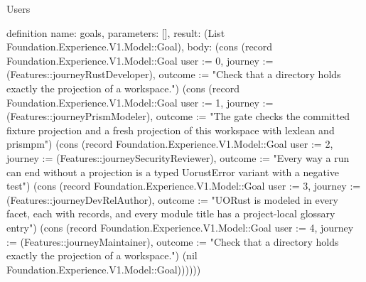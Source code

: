 \begin{lexlean}{Users}
\begin{semanticmodule}
definition{
  name: goals,
  parameters: [],
  result: (List Foundation.Experience.V1.Model::Goal),
  body: (cons (record Foundation.Experience.V1.Model::Goal {user := 0, journey := (Features::journeyRustDeveloper), outcome := "Check that a directory holds exactly the projection of a workspace."}) (cons (record Foundation.Experience.V1.Model::Goal {user := 1, journey := (Features::journeyPrismModeler), outcome := "The gate checks the committed fixture projection and a fresh projection of this workspace with lexlean and prismpm"}) (cons (record Foundation.Experience.V1.Model::Goal {user := 2, journey := (Features::journeySecurityReviewer), outcome := "Every way a run can end without a projection is a typed UorustError variant with a negative test"}) (cons (record Foundation.Experience.V1.Model::Goal {user := 3, journey := (Features::journeyDevRelAuthor), outcome := "UORust is modeled in every facet, each with records, and every module title has a project-local glossary entry"}) (cons (record Foundation.Experience.V1.Model::Goal {user := 4, journey := (Features::journeyMaintainer), outcome := "Check that a directory holds exactly the projection of a workspace."}) (nil Foundation.Experience.V1.Model::Goal))))))
}


\end{semanticmodule}
\end{lexlean}
